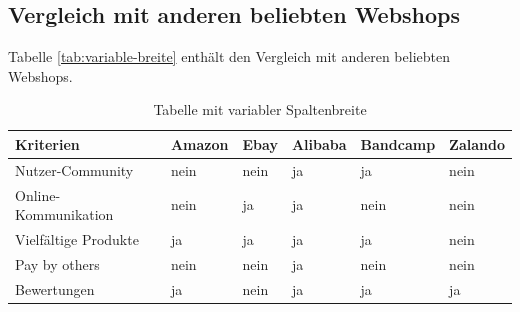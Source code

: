 \subsection{Vergleich mit anderen beliebten Webshops}

Tabelle \vref{tab:variable-breite} enthält den Vergleich mit anderen beliebten Webshops.

\begin{table}[htbp]
\centering
\begin{tabular}{l l l l l l}
\toprule
Kriterien				& Amazon	& Ebay	& Alibaba	& Bandcamp	& Zalando\\
\midrule
Nutzer-Community		& nein		& nein	& ja		& ja		& nein\\
Online-Kommunikation	& nein		& ja	& ja		& nein		& nein\\
Vielfältige Produkte	& ja		& ja	& ja		& ja		& nein\\
Pay by others			& nein		& nein	& ja		& nein		& nein\\
Bewertungen				& ja		& nein	& ja		& ja		& ja\\
\bottomrule
\end{tabular}
\caption{Tabelle mit variabler Spaltenbreite}
\label{tab:variable-breite}
\end{table}
